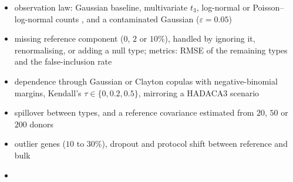 \begin{itemize}
  \item observation law: Gaussian baseline, multivariate \(t_{3}\), log-normal or Poisson--log-normal counts
        \cite{chiquetPoissonLognormalModelVersatile2021}, and a contaminated Gaussian (\(\varepsilon=0.05\))
  \item missing reference component (\(0\), \(2\) or \(10\%\)), handled by ignoring it, renormalising, or adding a null
        type; metrics: RMSE of the remaining types and the false-inclusion rate
  \item dependence through Gaussian or Clayton copulas with negative-binomial margins, Kendall's
        \(\tau\in\{0,0.2,0.5\}\), mirroring a HADACA3 scenario \cite{barbotPromisesLimitsMultimodal2026}
  \item spillover between types, and a reference covariance estimated from \(20\), \(50\) or \(200\) donors
  \item outlier genes (\(10\) to \(30\%\)), dropout and protocol shift between reference and bulk
        \cite{wangBulkTissueCell2019}
  \item {}
\end{itemize}

\glsaddall
\printnoidxglossary[title={Glossary},toctitle={Glossary}]
